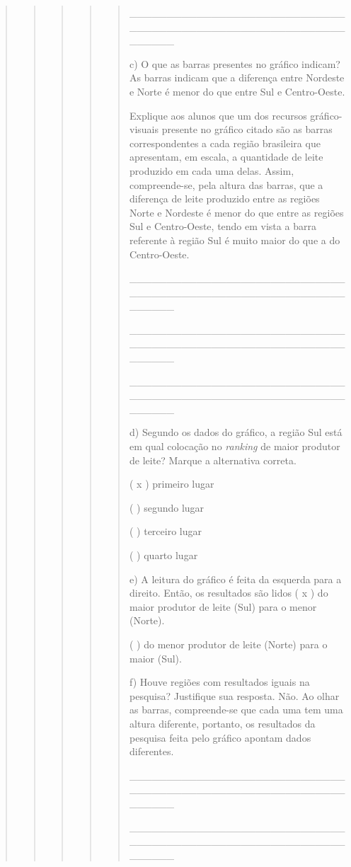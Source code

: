 \begin{quote}
\begin{quote}
\begin{quote}
\begin{quote}
\begin{quote}
\_\_\_\_\_\_\_\_\_\_\_\_\_\_\_\_\_\_\_\_\_\_\_\_\_\_\_\_\_\_\_\_\_\_\_\_\_\_\_\_\_\_\_\_\_\_\_\_\_\_\_\_\_\_\_\_\_\_\_\_\_\_\_\_

c) O que as barras presentes no gráfico indicam? As barras indicam que a
diferença entre Nordeste e Norte é menor do que entre Sul e
Centro-Oeste.

Explique aos alunos que um dos recursos gráfico-visuais presente no
gráfico citado são as barras correspondentes a cada região brasileira
que apresentam, em escala, a quantidade de leite produzido em cada uma
delas. Assim, compreende-se, pela altura das barras, que a diferença de
leite produzido entre as regiões Norte e Nordeste é menor do que entre
as regiões Sul e Centro-Oeste, tendo em vista a barra referente à região
Sul é muito maior do que a do Centro-Oeste.

\_\_\_\_\_\_\_\_\_\_\_\_\_\_\_\_\_\_\_\_\_\_\_\_\_\_\_\_\_\_\_\_\_\_\_\_\_\_\_\_\_\_\_\_\_\_\_\_\_\_\_\_\_\_\_\_\_\_\_\_\_\_\_\_

\_\_\_\_\_\_\_\_\_\_\_\_\_\_\_\_\_\_\_\_\_\_\_\_\_\_\_\_\_\_\_\_\_\_\_\_\_\_\_\_\_\_\_\_\_\_\_\_\_\_\_\_\_\_\_\_\_\_\_\_\_\_\_\_

\_\_\_\_\_\_\_\_\_\_\_\_\_\_\_\_\_\_\_\_\_\_\_\_\_\_\_\_\_\_\_\_\_\_\_\_\_\_\_\_\_\_\_\_\_\_\_\_\_\_\_\_\_\_\_\_\_\_\_\_\_\_\_\_

d) Segundo os dados do gráfico, a região Sul está em qual colocação no
\emph{ranking} de maior produtor de leite? Marque a alternativa correta.

( x ) primeiro lugar

( ) segundo lugar

( ) terceiro lugar

( ) quarto lugar

e) A leitura do gráfico é feita da esquerda para a direito. Então, os
resultados são lidos ( x ) do maior produtor de leite (Sul) para o menor
(Norte).

( ) do menor produtor de leite (Norte) para o maior (Sul).

f) Houve regiões com resultados iguais na pesquisa? Justifique sua
resposta. Não. Ao olhar as barras, compreende-se que cada uma tem uma
altura diferente, portanto, os resultados da pesquisa feita pelo gráfico
apontam dados diferentes.

\_\_\_\_\_\_\_\_\_\_\_\_\_\_\_\_\_\_\_\_\_\_\_\_\_\_\_\_\_\_\_\_\_\_\_\_\_\_\_\_\_\_\_\_\_\_\_\_\_\_\_\_\_\_\_\_\_\_\_\_\_\_\_\_

\_\_\_\_\_\_\_\_\_\_\_\_\_\_\_\_\_\_\_\_\_\_\_\_\_\_\_\_\_\_\_\_\_\_\_\_\_\_\_\_\_\_\_\_\_\_\_\_\_\_\_\_\_\_\_\_\_\_\_\_\_\_\_\_


\end{quote}
\end{quote}
\end{quote}
\end{quote}
\end{quote}
